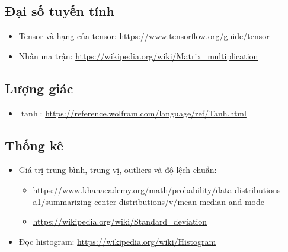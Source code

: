 \documentclass[12pt,a4paper]{article}
\newcommand{\mlccurl}[1]{\url{#1}}
\begin{document}
\subsection{Đại số tuyến tính}

\begin{phuongphap}[title={Các chủ đề đại số tuyến tính cần nắm}]
\begin{itemize}
  \item Tensor và hạng của tensor:
  \mlccurl{https://www.tensorflow.org/guide/tensor}
  \item Nhân ma trận:
  \mlccurl{https://wikipedia.org/wiki/Matrix_multiplication}
\end{itemize}
\end{phuongphap}

\subsection{Lượng giác}

\begin{phuongphap}[title={Một khái niệm liên quan hàm kích hoạt}]
\begin{itemize}
  \item \(\tanh\):
  \mlccurl{https://reference.wolfram.com/language/ref/Tanh.html}
\end{itemize}
\end{phuongphap}

\subsection{Thống kê}

\begin{phuongphap}[title={Các chủ đề thống kê cần nắm}]
\begin{itemize}
  \item Giá trị trung bình, trung vị, outliers và độ lệch chuẩn:
  \begin{itemize}
    \item \mlccurl{https://www.khanacademy.org/math/probability/data-distributions-a1/summarizing-center-distributions/v/mean-median-and-mode}
    \item \mlccurl{https://wikipedia.org/wiki/Standard_deviation}
  \end{itemize}

  \item Đọc histogram:
  \mlccurl{https://wikipedia.org/wiki/Histogram}
\end{itemize}
\end{phuongphap}
\end{document}
